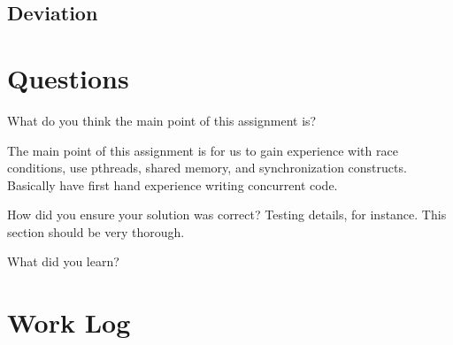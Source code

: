 \documentclass[letterpaper,10pt]{article}
\begin{document}
\subsection{Deviation}


\section{Questions}
\begin{description}
  \item  What do you think the main point of this assignment is?

         The main point of this assignment is for us to gain experience
         with race conditions, use pthreads, shared memory, and
         synchronization constructs. Basically have first hand
         experience writing concurrent code.

  \item  How did you ensure your solution was correct? Testing details, for
         instance. This section should be very thorough.

  \item  What did you learn?

\end{description}

\newpage

\section{Work Log}

%
\end{document}
